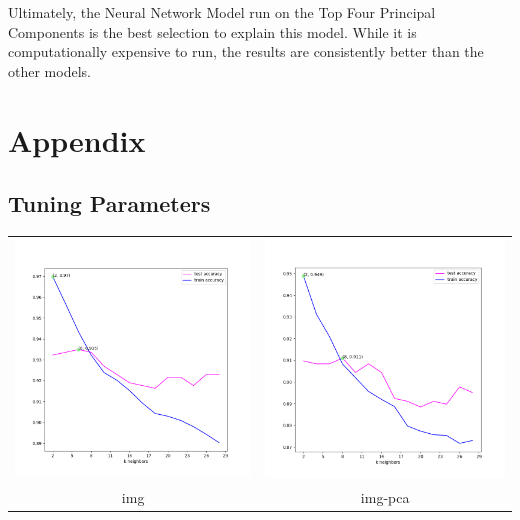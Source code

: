 \documentclass{article}
\begin{document}
Ultimately, the Neural Network Model run on the Top Four Principal Components is the best selection to explain this model. While it is computationally expensive to run, the results are consistently better than the other models.

\newpage

\section{Appendix}

\subsection{Tuning Parameters}

\footnotesize

\begin{table}[H] \label{KNN-tune}
    \centering
    \footnotesize
    \begin{tabular}{cc}

       \includegraphics[width = .45\textwidth]{images/knn-tune-rawimage.png}  & \includegraphics[width = .45\textwidth]{images/knn-tune-pcavimg.png}\\
       img  & img-pca  \\


\end{tabular}
\end{table}
\end{document}
